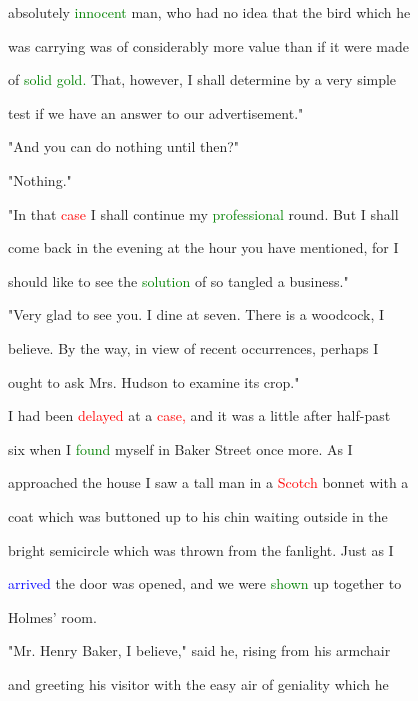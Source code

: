  absolutely \textcolor{green}{innocent} man, who had no idea that the bird which he

 was carrying was of considerably more value than if it were made

 of \textcolor{green}{solid} \textcolor{green}{gold.} That, however, I shall determine by a very simple

 test if we have an answer to our advertisement."



 "And you can do nothing until then?"



 "Nothing."



 "In that \textcolor{red}{case} I shall \textcolor{BurntOrange}{continue} my \textcolor{green}{professional} round. But I shall

 come back in the evening at the hour you have mentioned, for I

 should like to see the \textcolor{green}{solution} of so tangled a business."



 "Very \textcolor{BurntOrange}{glad} to see you. I dine at seven. There is a woodcock, I

 believe. By the way, in view of recent occurrences, perhaps I

 ought to ask Mrs. Hudson to examine its crop."



 I had been \textcolor{red}{delayed} at a \textcolor{red}{case,} and it was a little after half-past

 six when I \textcolor{green}{found} myself in Baker Street once more. As I

 approached the house I saw a tall man in a \textcolor{red}{Scotch} bonnet with a

 coat which was buttoned up to his chin \textcolor{BurntOrange}{waiting} outside in the

 bright semicircle which was thrown from the fanlight. Just as I

 \textcolor{blue}{arrived} the door was opened, and we were \textcolor{green}{shown} up together to

 Holmes' room.



 "Mr. Henry Baker, I believe," said he, rising from his armchair

 and greeting his \textcolor{BurntOrange}{visitor} with the easy air of geniality which he

